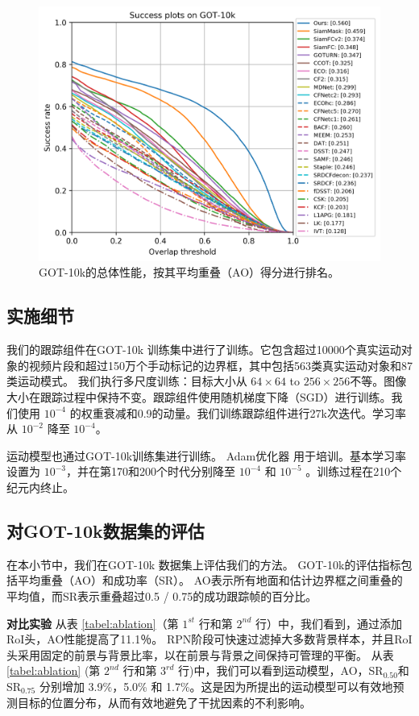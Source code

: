 \begin{figure}[htb]
    \includegraphics[width=1.0\textwidth]{Img/globally/success_plot.png}
    \caption{GOT-10k的总体性能，按其平均重叠（AO）得分进行排名。}
    \label{fig:ao}
\end{figure}

\subsection{实施细节}
我们的跟踪组件在GOT-10k \cite{GOT-10k} 训练集中进行了训练。它包含超过10000个真实运动对象的视频片段和超过150万个手动标记的边界框，其中包括563类真实运动对象和87类运动模式。
我们执行多尺度训练：目标大小从 $64 \times 64$ to $256 \times 256$不等。图像大小在跟踪过程中保持不变。跟踪组件使用随机梯度下降（SGD）进行训练。我们使用 $10^{-4}$ 的权重衰减和0.9的动量。我们训练跟踪组件进行27k次迭代。学习率从 $10^{-2}$ 降至 $10^{-4}$。

运动模型也通过GOT-10k训练集进行训练。 Adam优化器 \cite{kingma2014adam} 用于培训。基本学习率设置为 $10^{-3}$，并在第170和200个时代分别降至 $10^{-4}$ 和 $10^{-5}$ 。训练过程在210个纪元内终止。

\subsection{对GOT-10k数据集的评估}
在本小节中，我们在GOT-10k \cite{GOT-10k} 数据集上评估我们的方法。
GOT-10k的评估指标包括平均重叠（AO）和成功率（SR）。 AO表示所有地面和估计边界框之间重叠的平均值，而SR表示重叠超过0.5 / 0.75的成功跟踪帧的百分比。

\textbf{对比实验}
从表 \ref{tabel:ablation}（第 $1^{st}$ 行和第 $2^{nd}$ 行）中，我们看到，通过添加RoI头，AO性能提高了11.1％。 RPN阶段可快速过滤掉大多数背景样本，并且RoI头采用固定的前景与背景比率，以在前景与背景之间保持可管理的平衡。
从表 \ref{tabel:ablation} (第 $2^{nd}$ 行和第 $3^{rd}$ 行)中，我们可以看到运动模型，AO，SR$_{0.50}$和SR$_{0.75}$ 分别增加 3.9\%，5.0\% 和 1.7\%。这是因为所提出的运动模型可以有效地预测目标的位置分布，从而有效地避免了干扰因素的不利影响。

